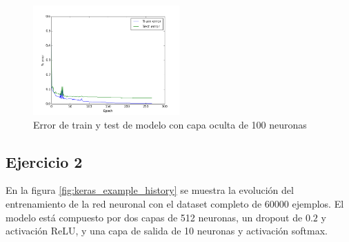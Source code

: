 \documentclass[11pt,spanish]{article}
\begin{document}
\begin{figure}[htbp]
	\centering
	\includegraphics[width=0.5\textwidth]{../ex1b3.png}
	\caption{Error de train y test de modelo con capa oculta de 100 neuronas}
	\label{ex1b3}
\end{figure}


\subsection*{Ejercicio 2}

En la figura \ref{fig:keras_example_history} se muestra la evolución del entrenamiento de la red neuronal con el dataset completo de $60000$ ejemplos.
El modelo está compuesto por dos capas de 512 neuronas, un dropout de $0.2$ y activación ReLU, y una capa de salida de 10 neuronas y activación softmax.
\end{document}
